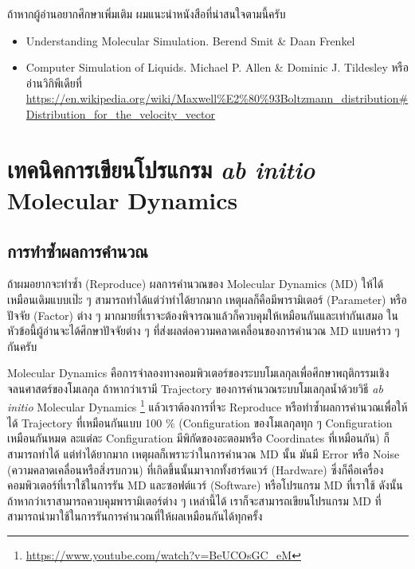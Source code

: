 ถ้าหากผู้อ่านอยากศึกษาเพิ่มเติม ผมแนะนำหนังสือที่น่าสนใจตามนี้ครับ

\begin{itemize}[topsep=0pt,noitemsep]
  \setlength\itemsep{0.5em}
  \item Understanding Molecular Simulation. Berend Smit \& Daan Frenkel

  \item Computer Simulation of Liquids.  Michael P. Allen \& Dominic J. Tildesley
        หรืออ่านวิกิพีเดียที่
        \url{https://en.wikipedia.org/wiki/Maxwell%E2%80%93Boltzmann_distribution#Distribution_for_the_velocity_vector}
\end{itemize}

\section{เทคนิคการเขียนโปรแกรม \textit{ab initio} Molecular Dynamics}

\subsection{การทำซ้ำผลการคำนวณ}

ถ้าผมอยากจะทำซ้ำ (Reproduce) ผลการคำนวณของ Molecular Dynamics (MD) ให้ได้เหมือนเดิมแบบเป๊ะ ๆ สามารถทำได้แต่ว่าทำได้ยากมาก
เหตุผลก็คือมีพารามิเตอร์ (Parameter) หรือปัจจัย (Factor) ต่าง ๆ มากมายที่เราจะต้องพิจารณาแล้วก็ควบคุมให้เหมือนกันและเท่ากันเสมอ
ในหัวข้อนี้ผู้อ่านจะได้ศึกษาปัจจัยต่าง ๆ ที่ส่งผลต่อความคลาดเคลื่อนของการคำนวณ MD แบบคร่าว ๆ กันครับ

Molecular Dynamics คือการจำลองทางคอมพิวเตอร์ของระบบโมเลกุลเพื่อศึกษาพฤติกรรมเชิงจลนศาสตร์ของโมเลกุล ถ้าหากว่าเรามี Trajectory
ของการคำนวณระบบโมเลกุลน้ำด้วยวิธี \textit{ab initio} Molecular Dynamics%
\footnote{\url{https://www.youtube.com/watch?v=BeUCOsGC_eM}}
แล้วเราต้องการที่จะ Reproduce หรือทำซ้ำผลการคำนวณเพื่อให้ได้ Trajectory ที่เหมือนกันแบบ 100 \% (Configuration ของโมเลกุลทุก ๆ
Configuration เหมือนกันหมด ละแต่ละ Configuration มีพิกัดของอะตอมหรือ Coordinates ที่เหมือนกัน) ก็สามารถทำได้ แต่ทำได้ยากมาก
เหตุผลก็เพราะว่าในการคำนวณ MD นั้น มันมี Error หรือ Noise (ความคลาดเคลื่อนหรือสิ่งรบกวน) ที่เกิดขึ้นนั้นมาจากทั้งฮาร์ดแวร์ (Hardware)
ซึ่งก็คือเครื่องคอมพิวเตอร์ที่เราใช้ในการรัน MD และซอฟต์แวร์ (Software) หรือโปรแกรม MD ที่เราใช้ ดังนั้นถ้าหากว่าเราสามารถควบคุมพารามิเตอร์ต่าง ๆ
เหล่านี้ได้ เราก็จะสามารถเขียนโปรแกรม MD ที่สามารถนำมาใช้ในการรันการคำนวณที่ให้ผลเหมือนกันได้ทุกครั้ง

